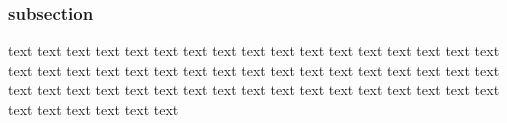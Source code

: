 \documentclass[report, backcover, english, nodocumentinfo]{upmethodology-document}
\begin{document}
				\subsubsection{subsection}
						text text text text text text text text text text text text text text text text text text text text text text text text text text text text text text text text text text text text text text text text text text text text text text text text text text text text text text text text text
\end{document}
